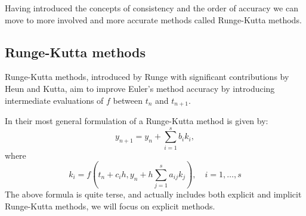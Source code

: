 \documentclass[11pt]{report}
\begin{document}
    Having introduced the concepts of consistency and the order of accuracy we can move to more involved and more
    accurate methods called Runge-Kutta methods.

    \subsection{Runge-Kutta methods}
    Runge-Kutta methods, introduced by Runge with significant contributions by Heun and Kutta, aim to improve Euler's
    method accuracy by introducing intermediate evaluations of $f$ between $t_n$ and $t_{n+1}$.

    In their most general formulation of a Runge-Kutta method is given by:
    \begin{equation}
        \label{eq:sol:rungekutta}
        y_{n+1} =
        y_{n} + \sum_{i=1}^s b_i k_i,
    \end{equation}
    where
    \begin{equation*}
        k_i = f\left(t_n + c_ih, y_n + h\sum_{j=1}^s a_{ij} k_j \right), \quad i=1,\dots,s
    \end{equation*}
    The above formula is quite terse, and actually includes both explicit and implicit Runge-Kutta methods, we will
    focus on explicit methods.
\end{document}

